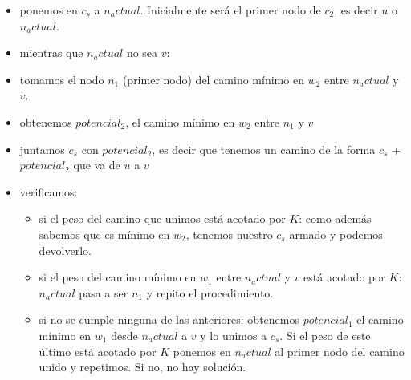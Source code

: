 \begin{itemize}
\item ponemos en $c_s$ a $n_actual$. Inicialmente ser\'a el primer nodo de $c_2$, es decir $u$ o $n_actual$.
\item mientras que $n_actual$ no sea $v$:
\item tomamos el nodo $n_1$ (primer nodo) del camino m\'inimo en $w_2$ entre $n_actual$ y $v$.
\item obtenemos $potencial_2$, el camino m\'inimo en $w_2$ entre $n_1$ y $v$
\item juntamos $c_s$ con $potencial_2$, es decir que tenemos un camino de la forma $c_s$ + $potencial_2$ que va de $u$ a $v$
\item verificamos:
\begin{itemize}
	\item si el peso del camino que unimos est\'a acotado por $K$: como adem\'as sabemos que es m\'inimo en $w_2$, tenemos nuestro $c_s$ armado y podemos devolverlo.
	\item si el peso del camino m\'inimo en $w_1$ entre $n_actual$ y $v$ est\'a acotado por $K$: $n_actual$ pasa a ser $n_1$ y repito el procedimiento.  
	\item si no se cumple ninguna de las anteriores: obtenemos $potencial_1$ el camino m\'inimo en $w_1$ desde $n_actual$ a $v$ y lo unimos a $c_s$. Si el peso de este \'ultimo est\'a acotado por $K$ ponemos en $n_actual$ al primer nodo del camino unido y repetimos. Si no, no hay soluci\'on.
\end{itemize}
\end{itemize}

\newpage
